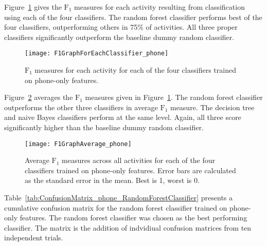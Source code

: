     Figure~\ref{fig:F1GraphForEachClassifier_phone} gives the $\mathrm{F}_1$ measures for each activity resulting from classification using each of the four classifiers. The random forest classifier performs best of the four classifiers, outperforming others in 75\% of activities. All three proper classifiers significantly outperform the baseline dummy random classifier.


    \begin{figure}[htb]
      \centering
      \texttt{[image: F1GraphForEachClassifier\_phone]}
      \caption{$\mathrm{F}_1$ measures for each activity for each of the four classifiers trained on phone-only features.}
      \label{fig:F1GraphForEachClassifier_phone}
    \end{figure}
    
    Figure~\ref{fig:F1GraphAverage_phone} averages the $\mathrm{F}_1$ measures given in Figure~\ref{fig:F1GraphForEachClassifier_phone}. The random forest classifier outperforms the other three classifiers in average $\mathrm{F}_1$ measure. The decision tree and naive Bayes classifiers perform at the same level. Again, all three score significantly higher than the baseline dummy random classifier.
    
    \begin{figure}[htb]
      \centering
      \texttt{[image: F1GraphAverage\_phone]}
      \caption{Average $\mathrm{F}_1$ measures across all activities for each of the four classifiers trained on phone-only features. Error bars are calculated as the standard error in the mean. Best is 1, worst is 0.}
      \label{fig:F1GraphAverage_phone} 
    \end{figure}
    
    Table~\ref{tab:ConfusionMatrix_phone_RandomForestClassifier} presents a cumulative confusion matrix for the random forest classifier trained on phone-only features. The random forest classifier was chosen as the best performing classifier. The matrix is the addition of indvidiual confusion matrices from ten independent trials.
    
